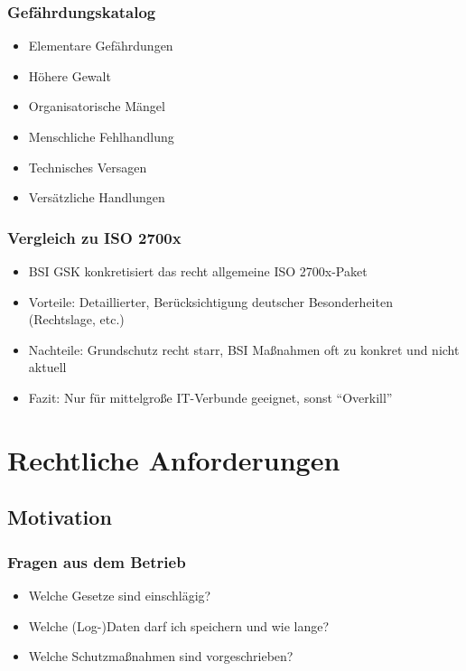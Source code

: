 \subsubsection{Gefährdungskatalog}
\begin{itemize}
	\item Elementare Gefährdungen
	\item Höhere Gewalt
	\item Organisatorische Mängel
	\item Menschliche Fehlhandlung
	\item Technisches Versagen
	\item Versätzliche Handlungen
\end{itemize}

\subsubsection{Vergleich zu ISO 2700x}
\begin{itemize}
	\item BSI GSK konkretisiert das recht allgemeine ISO 2700x-Paket
	\item Vorteile: Detaillierter, Berücksichtigung deutscher Besonderheiten (Rechtslage, etc.)
	\item Nachteile: Grundschutz recht starr, BSI Maßnahmen oft zu konkret und nicht aktuell
	\item Fazit: Nur für mittelgroße IT-Verbunde geeignet, sonst "`Overkill"'
\end{itemize}



\section{Rechtliche Anforderungen}

\subsection{Motivation}

\subsubsection{Fragen aus dem Betrieb}
\begin{itemize}
	\item Welche Gesetze sind einschlägig?
	\item Welche (Log-)Daten darf ich speichern und wie lange?
	\item Welche Schutzmaßnahmen sind vorgeschrieben?
\end{itemize}

